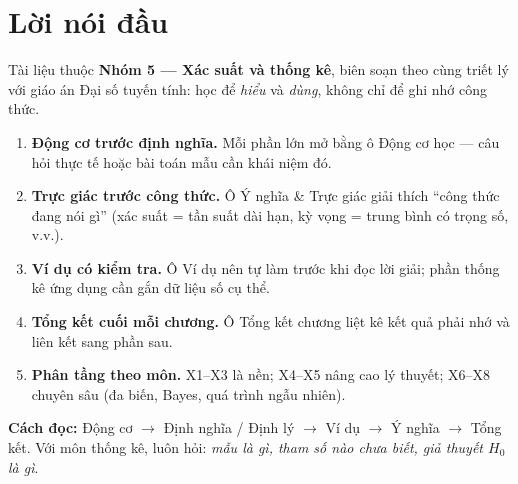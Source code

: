 \section*{Lời nói đầu}

Tài liệu thuộc \textbf{Nhóm 5 --- Xác suất và thống kê}, biên soạn theo cùng triết lý với giáo án Đại số tuyến tính: học để \emph{hiểu} và \emph{dùng}, không chỉ để ghi nhớ công thức.

\begin{enumerate}
  \item \textbf{Động cơ trước định nghĩa.} Mỗi phần lớn mở bằng ô \textsf{\color{teal!60!black} Động cơ học} --- câu hỏi thực tế hoặc bài toán mẫu cần khái niệm đó.
  \item \textbf{Trực giác trước công thức.} Ô \textsf{\color{purple!50!black} Ý nghĩa \& Trực giác} giải thích ``công thức đang nói gì'' (xác suất = tần suất dài hạn, kỳ vọng = trung bình có trọng số, v.v.).
  \item \textbf{Ví dụ có kiểm tra.} Ô \textsf{\color{violet!50!black} Ví dụ} nên tự làm trước khi đọc lời giải; phần thống kê ứng dụng cần gắn dữ liệu số cụ thể.
  \item \textbf{Tổng kết cuối mỗi chương.} Ô \textsf{\color{blue!70!black} Tổng kết chương} liệt kê kết quả phải nhớ và liên kết sang phần sau.
  \item \textbf{Phân tầng theo môn.} X1--X3 là nền; X4--X5 nâng cao lý thuyết; X6--X8 chuyên sâu (đa biến, Bayes, quá trình ngẫu nhiên).
\end{enumerate}

\noindent\textbf{Cách đọc:} Động cơ $\to$ Định nghĩa / Định lý $\to$ Ví dụ $\to$ Ý nghĩa $\to$ Tổng kết. Với môn thống kê, luôn hỏi: \emph{mẫu là gì, tham số nào chưa biết, giả thuyết $H_0$ là gì}.

\newpage
